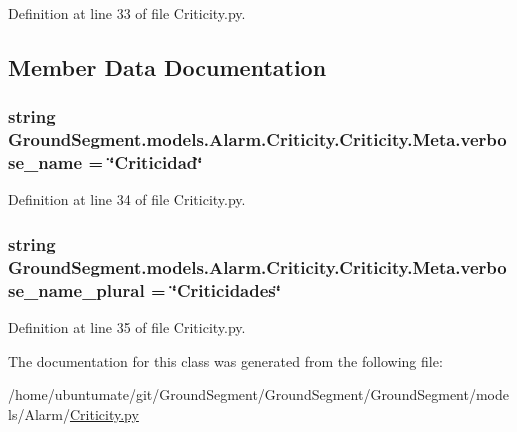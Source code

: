 Definition at line 33 of file Criticity.\+py.



\subsection{Member Data Documentation}
\hypertarget{class_ground_segment_1_1models_1_1_alarm_1_1_criticity_1_1_criticity_1_1_meta_a77545e85b931b43e2c2c1075e2dc7b89}{}
\subsubsection[{verbose\+\_\+name}]{\setlength{\rightskip}{0pt plus 5cm}string Ground\+Segment.\+models.\+Alarm.\+Criticity.\+Criticity.\+Meta.\+verbose\+\_\+name = \char`\"{}Criticidad\char`\"{}\hspace{0.3cm}{\ttfamily [static]}}\label{class_ground_segment_1_1models_1_1_alarm_1_1_criticity_1_1_criticity_1_1_meta_a77545e85b931b43e2c2c1075e2dc7b89}


Definition at line 34 of file Criticity.\+py.

\hypertarget{class_ground_segment_1_1models_1_1_alarm_1_1_criticity_1_1_criticity_1_1_meta_a27f1d87c0d59a1686bcb0026bd3bb25c}{}
\subsubsection[{verbose\+\_\+name\+\_\+plural}]{\setlength{\rightskip}{0pt plus 5cm}string Ground\+Segment.\+models.\+Alarm.\+Criticity.\+Criticity.\+Meta.\+verbose\+\_\+name\+\_\+plural = \char`\"{}Criticidades\char`\"{}\hspace{0.3cm}{\ttfamily [static]}}\label{class_ground_segment_1_1models_1_1_alarm_1_1_criticity_1_1_criticity_1_1_meta_a27f1d87c0d59a1686bcb0026bd3bb25c}


Definition at line 35 of file Criticity.\+py.



The documentation for this class was generated from the following file\+:\begin{DoxyCompactItemize}
\item 
/home/ubuntumate/git/\+Ground\+Segment/\+Ground\+Segment/\+Ground\+Segment/models/\+Alarm/\hyperlink{_criticity_8py}{Criticity.\+py}\end{DoxyCompactItemize}
